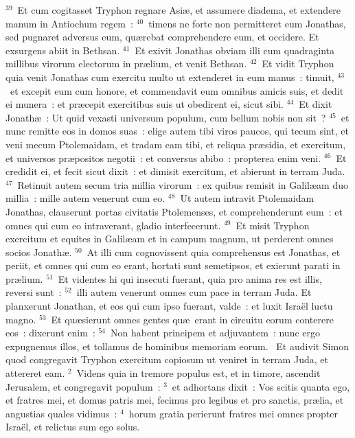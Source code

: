 ${}^{39}$~Et cum cogitasset Tryphon regnare Asi\ae , et assumere diadema, et extendere manum in Antiochum regem~:
${}^{40}$~timens ne forte non permitteret eum Jonathas, sed pugnaret adversus eum, qu\ae rebat comprehendere eum, et occidere. Et exsurgens abiit in Bethsan.
${}^{41}$~Et exivit Jonathas obviam illi cum quadraginta millibus virorum electorum in pr\ae lium, et venit Bethsan.
${}^{42}$~Et vidit Tryphon quia venit Jonathas cum exercitu multo ut extenderet in eum manus~: timuit,
${}^{43}$~et excepit eum cum honore, et commendavit eum omnibus amicis suis, et dedit ei munera~: et pr\ae cepit exercitibus suis ut obedirent ei, sicut sibi.
${}^{44}$~Et dixit Jonath\ae~: Ut quid vexasti universum populum, cum bellum nobis non sit~?
${}^{45}$~et nunc remitte eos in domos suas~: elige autem tibi viros paucos, qui tecum sint, et veni mecum Ptolemaidam, et tradam eam tibi, et reliqua pr\ae sidia, et exercitum, et universos pr\ae positos negotii~: et conversus abibo~: propterea enim veni.
${}^{46}$~Et credidit ei, et fecit sicut dixit~: et dimisit exercitum, et abierunt in terram Juda.
${}^{47}$~Retinuit autem secum tria millia virorum~: ex quibus remisit in Galil\ae am duo millia~: mille autem venerunt cum eo.
${}^{48}$~Ut autem intravit Ptolemaidam Jonathas, clauserunt portas civitatis Ptolemenses, et comprehenderunt eum~: et omnes qui cum eo intraverant, gladio interfecerunt.
${}^{49}$~Et misit Tryphon exercitum et equites in Galil\ae am et in campum magnum, ut perderent omnes socios Jonath\ae .
${}^{50}$~At illi cum cognovissent quia comprehensus est Jonathas, et periit, et omnes qui cum eo erant, hortati sunt semetipsos, et exierunt parati in pr\ae lium.
${}^{51}$~Et videntes hi qui insecuti fuerant, quia pro anima res est illis, reversi sunt~:
${}^{52}$~illi autem venerunt omnes cum pace in terram Juda. Et planxerunt Jonathan, et eos qui cum ipso fuerant, valde~: et luxit Isra\"el luctu magno.
${}^{53}$~Et qu\ae sierunt omnes gentes qu\ae\ erant in circuitu eorum conterere eos~: dixerunt enim~:
${}^{54}$~Non habent principem et adjuvantem~: nunc ergo expugnemus illos, et tollamus de hominibus memoriam eorum.
~Et audivit Simon quod congregavit Tryphon exercitum copiosum ut veniret in terram Juda, et attereret eam.
${}^{2}$~Videns quia in tremore populus est, et in timore, ascendit Jerusalem, et congregavit populum~:
${}^{3}$~et adhortans dixit~: Vos scitis quanta ego, et fratres mei, et domus patris mei, fecimus pro legibus et pro sanctis, pr\ae lia, et angustias quales vidimus~:
${}^{4}$~horum gratia perierunt fratres mei omnes propter Isra\"el, et relictus sum ego solus.
